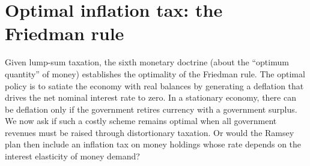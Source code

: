 

  
\section{Optimal inflation tax:  the Friedman rule}
Given lump-sum taxation, the sixth monetary doctrine (about
the ``optimum quantity'' of money) establishes the optimality of the Friedman
rule. The optimal policy is to satiate the economy with real balances by
generating a deflation that drives the net nominal interest rate to zero.
In a stationary economy, there can be deflation only if the government
retires currency with a
government surplus. We now ask if such a costly scheme remains
optimal when all government revenues must be raised through distortionary
taxation. Or would the Ramsey plan then include an inflation tax on
money holdings whose rate depends on the interest elasticity of money demand?


